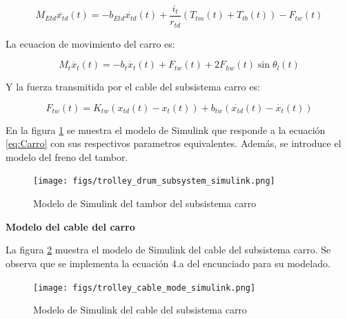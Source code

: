 \documentclass{article}
\begin{document}
            \begin{equation} \label{eq:TamborCarro}
                M_{Etd} \ddot{x_{td}}(t) = - b_{Etd} \dot{x_{td}}(t) + \frac{i_t}{r_{td}} (T_{tm}(t) + T_{tb}(t)) - F_{tw}(t)
            \end{equation}

            La ecuacion de movimiento del carro es:

            \begin{equation} \label{eq:Carro}
                M_t \ddot{x_{t}}(t) = - b_t \dot{x_{t}}(t) + F_{tw}(t) + 2F_{hw}(t)\sin{\theta_l(t)}
            \end{equation}

            Y la fuerza transmitida por el cable del subsistema carro es:

            \begin{equation} \label{eq:fuerzaCableCarro}
                F_{tw}(t) = K_{tw}(x_{td}(t) - x_t(t)) + b_{tw}(\dot{x_{td}}(t) - \dot{x_t}(t))
            \end{equation}

            En la figura \ref{fig:trolley_drum_mode_simulink} se muestra el modelo de Simulink que responde a la ecuación \ref{eq:Carro} con sus respectivos parametros equivalentes. Además, se introduce el modelo del freno del tambor.
            \begin{figure} [H]
                \centering
                \texttt{[image: figs/trolley\_drum\_subsystem\_simulink.png]}
                \caption{Modelo de Simulink del tambor del subsistema carro}
                \label{fig:trolley_drum_mode_simulink}
            \end{figure}

            \textbf{Modelo del cable del carro}

            La figura \ref{fig:trolley_cable_mode_simulink} muestra el modelo de Simulink del cable del subsistema carro. Se observa que se implementa la ecuación 4.a del encunciado para su modelado.
            
            \begin{figure} [H]
                \centering
                \texttt{[image: figs/trolley\_cable\_mode\_simulink.png]}
                \caption{Modelo de Simulink del cable del subsistema carro}
                \label{fig:trolley_cable_mode_simulink}
            \end{figure}

            
\end{document}

